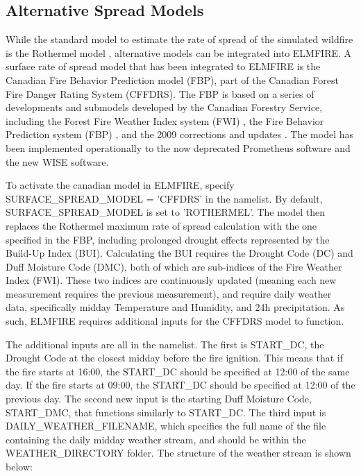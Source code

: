 \subsection{Alternative Spread Models}
\label{alternative_models}

While the standard model to estimate the rate of spread of the simulated wildfire is the Rothermel model \cite{rothermelMathematicalModelPredicting1972, andrewsRothermelSurfaceFire2018}, alternative models can be integrated into ELMFIRE. A surface rate of spread model that has been integrated to ELMFIRE is the Canadian Fire Behavior Prediction model (FBP), part of the Canadian Forest Fire Danger Rating System (CFFDRS). The FBP is based on a series of developments and submodels developed by the Canadian Forestry Service, including the Forest Fire Weather Index system (FWI) \cite{vanwagnerDevelopmentStructureCanadian1987}, the Fire Behavior Prediction system (FBP) \cite{DevelopmentStructureCanadian1992}, and the 2009 corrections and updates \cite{wottonUpdatesRevisions19922009}. The model has been implemented operationally to the now deprecated Prometheus software \cite{tymstraDevelopmentStructurePrometheus2010} and the new WISE software. 

To activate the canadian model in ELMFIRE, specify SURFACE\_SPREAD\_MODEL = 'CFFDRS' in the  namelist. By default, SURFACE\_SPREAD\_MODEL is set to 'ROTHERMEL'. The model then replaces the Rothermel maximum rate of spread calculation with the one specified in the FBP, including prolonged drought effects represented by the Build-Up Index (BUI). Calculating the BUI requires the Drought Code (DC) and Duff Moisture Code (DMC), both of which are sub-indices of the Fire Weather Index (FWI). These two indices are continuously updated (meaning each new measurement requires the previous measurement), and require daily weather data, specifically midday Temperature and Humidity, and 24h precipitation. As such, ELMFIRE requires additional inputs for the CFFDRS model to function. 

The additional inputs are all in the  namelist. The first is START\_DC, the Drought Code at the closest midday before the fire ignition. This means that if the fire starts at 16:00, the START\_DC should be specified at 12:00 of the same day. If the fire starts at 09:00, the START\_DC should be specified at 12:00 of the previous day. The second new input is the starting Duff Moisture Code, START\_DMC, that functions similarly to START\_DC. The third input is DAILY\_WEATHER\_FILENAME, which specifies the full name of the file containing the daily midday weather stream, and should be within the WEATHER\_DIRECTORY folder. The structure of the weather stream is shown below: 


